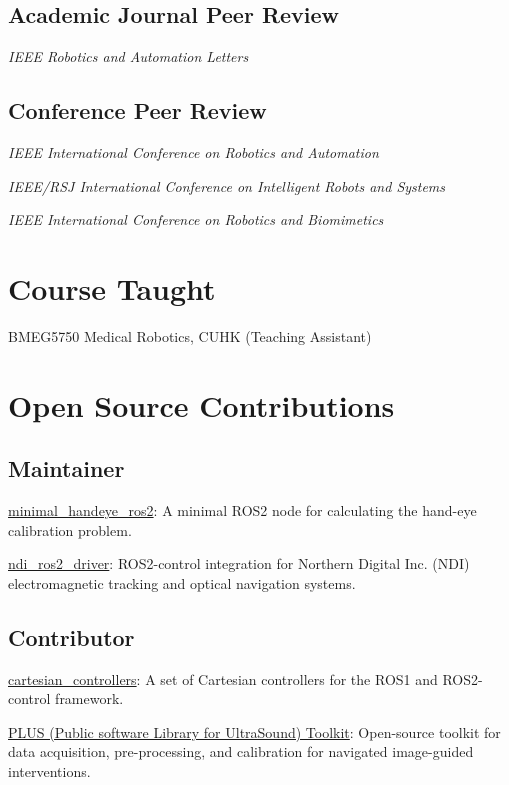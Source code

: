 \documentclass[11pt,letterpaper]{report}
\newcommand{\listitemspace}{0.25em}
\renewenvironment{itemize}
{\begin{list}{}{\setlength{\leftmargin}{0em}
			\setlength{\parskip}{0em}
			\setlength{\itemsep}{\listitemspace}
			\setlength{\parsep}{\listitemspace}}}
	{\end{list}}
\begin{document}
\subsection*{Academic Journal Peer Review}
\begin{itemize}
	\item \textit{IEEE Robotics and Automation Letters}
\end{itemize}
\subsection*{Conference Peer Review}
\begin{itemize}
	\item \textit{IEEE International Conference on Robotics and Automation}
	\item \textit{IEEE/RSJ International Conference	on Intelligent Robots and Systems}
	\item \textit{IEEE International Conference on Robotics and Biomimetics}
\end{itemize}


\section*{Course Taught}
\begin{itemize}
	\item BMEG5750 Medical Robotics, CUHK (Teaching Assistant)
\end{itemize}

\section*{Open Source Contributions}
\subsection*{Maintainer}
\begin{itemize}
	\item  \href{https://github.com/zixingjiang/minimal_handeye_ros2}{minimal\_handeye\_ros2}\faGithub: A minimal ROS2 node for calculating the hand-eye calibration problem.
	\item  \href{https://github.com/zixingjiang/ndi_ros2_driver}{ndi\_ros2\_driver}\faGithub: ROS2-control integration for Northern Digital Inc. (NDI) electromagnetic tracking and optical navigation systems.
\end{itemize}
\subsection*{Contributor}
\begin{itemize}
	\item \href{https://github.com/fzi-forschungszentrum-informatik/cartesian_controllers}{cartesian\_controllers}\faGithub: A set of Cartesian controllers for the ROS1 and ROS2-control framework.
	\item \href{https://github.com/PlusToolkit}{PLUS (Public software Library for UltraSound) Toolkit}\faGithub: Open-source toolkit for data acquisition, pre-processing, and calibration for navigated image-guided interventions.
\end{itemize}
\end{document}
